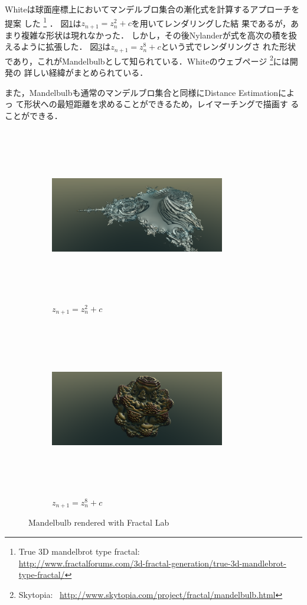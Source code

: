 Whiteは球面座標上においてマンデルブロ集合の漸化式を計算するアプローチを提案
した
\footnote{True 3D mandelbrot type fractal: \\
\url{http://www.fractalforums.com/3d-fractal-generation/true-3d-mandlebrot-type-fractal/}}
．
図\ref{fig:mandelbulb2}は$z_{n+1} = z_n^2 + c$を用いてレンダリングした結
果であるが，あまり複雑な形状は現れなかった．
しかし，その後Nylanderが式を高次の積を扱えるように拡張した．
図\ref{fig:mandelbulb8}は$z_{n+1} = z_n^8 + c $という式でレンダリングさ
れた形状であり，これがMandelbulbとして知られている．Whiteのウェブページ
\footnote{Skytopia:
~\url{http://www.skytopia.com/project/fractal/mandelbulb.html}}には開発の
詳しい経緯がまとめられている．

また，Mandelbulbも通常のマンデルブロ集合と同様にDistance Estimationによっ
て形状への最短距離を求めることができるため，レイマーチングで描画す
ることができる．

\begin{figure}[h!tbp]
 \begin{subfigure}{0.49\hsize}
  \center
  \includegraphics[width=3in, height=3in, keepaspectratio]{../img/fractal/mandelbulb2.pdf}
  \caption{$z_{n + 1} = z_n^2 + c$}
  \label{fig:mandelbulb2}
 \end{subfigure}
 \hspace*{\fill}
 \begin{subfigure}{0.49\hsize}
  \center
  \includegraphics[width=3in, height=3in, keepaspectratio]{../img/fractal/mandelbulb8.pdf}
  \caption{$z_{n+1} = z_n^8 + c$}
  \label{fig:mandelbulb8}
 \end{subfigure}
 \caption{Mandelbulb rendered with Fractal Lab}
\end{figure}

